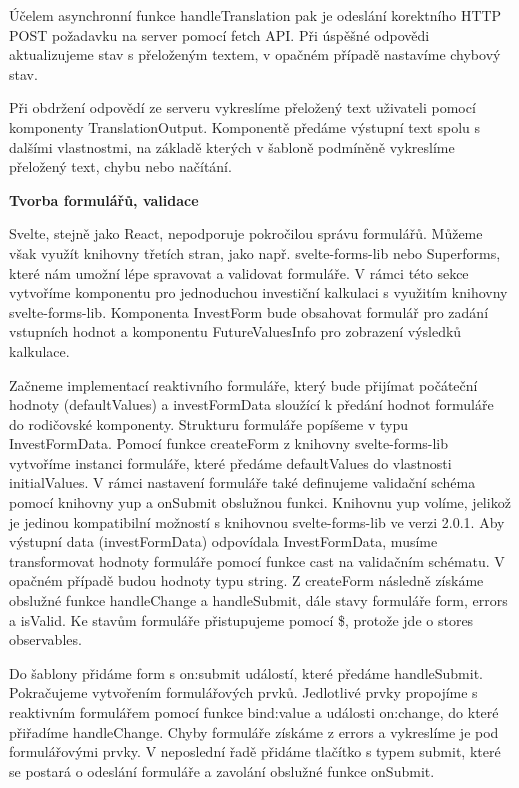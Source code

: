 Účelem asynchronní funkce handleTranslation pak je odeslání korektního HTTP POST požadavku na server pomocí fetch API. 
Při úspěšné odpovědi aktualizujeme stav s přeloženým textem, v opačném případě nastavíme chybový stav.

Při obdržení odpovědí ze serveru vykreslíme přeložený text uživateli pomocí komponenty TranslationOutput. 
Komponentě předáme výstupní text spolu s dalšími vlastnostmi, na základě kterých v šabloně podmíněně vykreslíme přeložený text, chybu nebo načítání.

\begin{flushleft}
  \textbf{Tvorba formulářů, validace}
\end{flushleft}

Svelte, stejně jako React, nepodporuje pokročilou správu formulářů. Můžeme však využít knihovny třetích stran, jako např. svelte-forms-lib nebo Superforms, které nám umožní lépe spravovat a validovat formuláře. 
V rámci této sekce vytvoříme komponentu pro jednoduchou investiční kalkulaci s využitím knihovny svelte-forms-lib. 
Komponenta InvestForm bude obsahovat formulář pro zadání vstupních hodnot a komponentu FutureValuesInfo pro zobrazení výsledků kalkulace.

Začneme implementací reaktivního formuláře, který bude přijímat počáteční hodnoty (defaultValues) a investFormData sloužící k předání hodnot formuláře do rodičovské komponenty. 
Strukturu formuláře popíšeme v typu InvestFormData. Pomocí funkce createForm z knihovny svelte-forms-lib vytvoříme instanci formuláře, které předáme defaultValues do vlastnosti initialValues. 
V rámci nastavení formuláře také definujeme validační schéma pomocí knihovny yup a onSubmit obslužnou funkci. Knihovnu yup volíme, jelikož je jedinou kompatibilní možností s knihovnou svelte-forms-lib ve verzi 2.0.1. 
Aby výstupní data (investFormData) odpovídala InvestFormData, musíme transformovat hodnoty formuláře pomocí funkce cast na validačním schématu. V opačném případě budou hodnoty typu string. 
Z createForm následně získáme obslužné funkce handleChange a handleSubmit, dále stavy formuláře form, errors a isValid. Ke stavům formuláře přistupujeme pomocí \$, protože jde o stores observables.

Do šablony přidáme form s on:submit událostí, které předáme handleSubmit. Pokračujeme vytvořením formulářových prvků. 
Jedlotlivé prvky propojíme s reaktivním formulářem pomocí funkce bind:value a události on:change, do které přiřadíme handleChange. Chyby formuláře získáme z errors a vykreslíme je pod formulářovými prvky. 
V neposlední řadě přidáme tlačítko s typem submit, které se postará o odeslání formuláře a zavolání obslužné funkce onSubmit.

